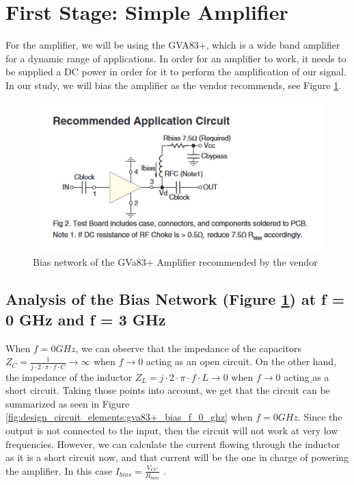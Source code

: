 \documentclass[12pt]{report} %
\begin{document}
\section{First Stage: Simple Amplifier}

For the amplifier, we will be using the GVA83+, which is a wide band amplifier for a dynamic range of applications. In order for an amplifier to work, it needs to be supplied a DC power in order for it to perform the amplification of our signal. In our study, we will bias the amplifier as the vendor recommends, see Figure \ref{fig:design_circuit_elements:gva83+_bias_configuration}. 

\begin{figure}[htbp]
    \centering
    \includegraphics[width=\textwidth]{images/design_circuit_elements/gva83+_bias_configuration.png}
    \caption{Bias network of the GVa83+ Amplifier recommended by the vendor}
    \label{fig:design_circuit_elements:gva83+_bias_configuration}
\end{figure}

\subsection{Analysis of the Bias Network (Figure \ref{fig:design_circuit_elements:gva83+_bias_configuration}) at f = 0 GHz and f = 3 GHz}

When $f = 0 GHz$, we can observe that the impedance of the capacitors $Z_{C} = \frac{1}{j \cdot 2 \cdot \pi \cdot f \cdot C} \xrightarrow{} \infty$ when $f \xrightarrow{} 0$ acting as an open circuit. On the other hand, the impedance of the inductor $Z_{L} = j \cdot 2 \cdot \pi \cdot f \cdot L \xrightarrow{} 0$ when $f \xrightarrow{} 0$ acting as a short circuit. Taking those points into account, we get that the circuit can be summarized as seen in Figure \ref{fig:design_circuit_elements:gva83+_bias_f_0_ghz} when $f = 0 GHz$. Since the output is not connected to the input, then the circuit will not work at very low frequencies. However, we can calculate the current flowing through the inductor as it is a short circuit now, and that current will be the one in charge of powering the amplifier. In this case $I_{bias} = \frac{V_{CC}}{R_{bias}}$ .
\end{document}
